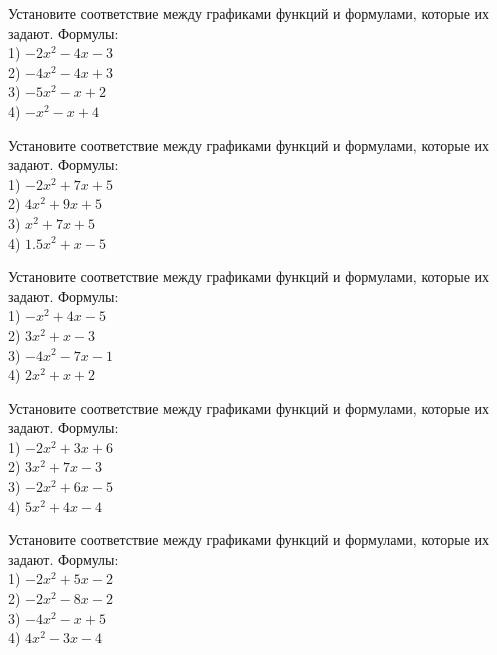 \documentclass[4apaper]{article}
\begin{document}
\begin{taskBN}{47}
Установите соответствие между графиками функций и формулами, которые их задают. Формулы: \\1) $-2x^2-4x-3$\\2) $-4x^2-4x+3$\\3) $-5x^2-x+2$\\4) $-x^2-x+4$
\end{taskBN}

\begin{taskBN}{48}
Установите соответствие между графиками функций и формулами, которые их задают. Формулы: \\1) $-2x^2+7x+5$\\2) $4x^2+9x+5$\\3) $x^2+7x+5$\\4) $1.5x^2+x-5$
\end{taskBN}

\begin{taskBN}{49}
Установите соответствие между графиками функций и формулами, которые их задают. Формулы: \\1) $-x^2+4x-5$\\2) $3x^2+x-3$\\3) $-4x^2-7x-1$\\4) $2x^2+x+2$
\end{taskBN}

\begin{taskBN}{50}
Установите соответствие между графиками функций и формулами, которые их задают. Формулы: \\1) $-2x^2+3x+6$\\2) $3x^2+7x-3$\\3) $-2x^2+6x-5$\\4) $5x^2+4x-4$
\end{taskBN}

\begin{taskBN}{51}
Установите соответствие между графиками функций и формулами, которые их задают. Формулы: \\1) $-2x^2+5x-2$\\2) $-2x^2-8x-2$\\3) $-4x^2-x+5$\\4) $4x^2-3x-4$
\end{taskBN}
\end{document}
